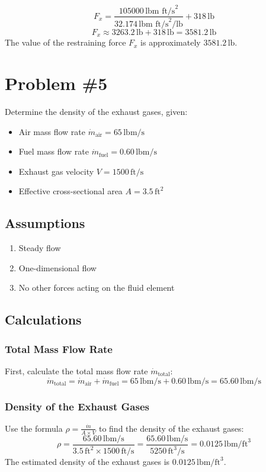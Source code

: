 \documentclass{article}
\begin{document}
\[
F_x = \frac{105000 \, \text{lbm ft/s}^2}{32.174 \, \text{lbm ft/s}^2/\text{lb}} + 318 \, \text{lb}
\]
\[
F_x \approx 3263.2 \, \text{lb} + 318 \, \text{lb} = 3581.2 \, \text{lb}
\]
The value of the restraining force \( F_x \) is approximately \( 3581.2 \, \text{lb} \).




\newpage
\section*{Problem \#5}
Determine the density of the exhaust gases, given:
\begin{itemize}
    \item Air mass flow rate \(\dot{m}_{\text{air}} = 65 \, \text{lbm/s}\)
    \item Fuel mass flow rate \(\dot{m}_{\text{fuel}} = 0.60 \, \text{lbm/s}\)
    \item Exhaust gas velocity \(V = 1500 \, \text{ft/s}\)
    \item Effective cross-sectional area \(A = 3.5 \, \text{ft}^2\)
\end{itemize}

\subsection*{Assumptions}
\begin{enumerate}
    \item Steady flow
    \item One-dimensional flow
    \item No other forces acting on the fluid element
\end{enumerate}

\subsection*{Calculations}

\subsubsection*{Total Mass Flow Rate}
First, calculate the total mass flow rate \(\dot{m}_{\text{total}}\):
\[
\dot{m}_{\text{total}} = \dot{m}_{\text{air}} + \dot{m}_{\text{fuel}} = 65 \, \text{lbm/s} + 0.60 \, \text{lbm/s} = 65.60 \, \text{lbm/s}
\]

\subsubsection*{Density of the Exhaust Gases}
Use the formula \(\rho = \frac{\dot{m}}{A \times V}\) to find the density of the exhaust gases:
\[
\rho = \frac{65.60 \, \text{lbm/s}}{3.5 \, \text{ft}^2 \times 1500 \, \text{ft/s}} = \frac{65.60 \, \text{lbm/s}}{5250 \, \text{ft}^3/\text{s}} = 0.0125 \, \text{lbm/ft}^3
\]
The estimated density of the exhaust gases is \(0.0125 \, \text{lbm/ft}^3\).
\end{document}
